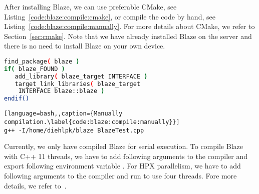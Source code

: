 After installing Blaze, we can use preferable CMake, see Listing~\ref{code:blaze:compile:cmake}, or compile the code by hand, see Listing~\ref{code:blaze:compile:manually}. For more details about CMake, we refer to Section~\ref{sec:cmake}. Note that we have already installed Blaze on the server and there is no need to install Blaze on your own device.

\begin{minipage}{\linewidth}
\begin{minipage}{0.45\linewidth}
\begin{lstlisting}[language=bash,caption={Compilation using CMake.\label{code:blaze:compile:cmake}}]
find_package( blaze )
if( blaze_FOUND )
   add_library( blaze_target INTERFACE )
   target_link_libraries( blaze_target 
   	INTERFACE blaze::blaze )
endif()
\end{lstlisting}
\end{minipage}
\hfill
\begin{minipage}{0.45\linewidth}
\begin{lstlisting}[language=bash,,caption={Manually compilation.\label{code:blaze:compile:manually}}]
g++ -I/home/diehlpk/blaze BlazeTest.cpp
\end{lstlisting}
\end{minipage}
\end{minipage}

Currently, we only have compiled Blaze for serial execution. To compile Blaze with C++ 11 threads, we have to add following arguments  to the compiler and export following environment variable . For HPX parallelism, we have to add following arguments  to the compiler and run  to use four threads. Fore more details, we refer to~.

